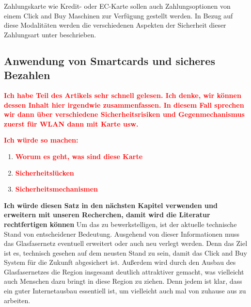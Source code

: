 Zahlungskarte wie Kredit- oder EC-Karte sollen auch Zahlungsoptionen von einem Click and Buy Maschinen
zur Verfügung gestellt werden. In Bezug auf diese Modalitäten werden die verschiedenen Aspekten der 
Sicherheit dieser Zahlungsart unter beschrieben.


\subsection{Anwendung von Smartcards und sicheres Bezahlen}
\textbf{\textcolor{red}{Ich habe Teil des Artikels sehr schnell gelesen. Ich denke, wir können dessen Inhalt hier
irgendwie zusammenfassen. In diesem Fall sprechen wir dann über verschiedene Sicherheitsrisiken und Gegenmechanismus
zuerst für WLAN dann mit Karte usw.}}

\textbf{\textcolor{red}{Ich würde so machen:}}


\begin{enumerate}
    \item \textbf{\textcolor{red}{Worum es geht, was sind diese Karte}}
    \item \textbf{\textcolor{red}{Sicherheitslücken}}
    \item \textbf{\textcolor{red}{Sicherheitsmechanismen}}
\end{enumerate}



\vspace{2cm}
\textbf{Ich würde diesen Satz in den nächsten Kapitel verwenden und erweitern mit unseren Recherchen, damit wird 
die Literatur rechtfertigen können}
Um das zu bewerkstelligen, ist der aktuelle technische Stand von entscheidener Bedeutung. 
Ausgehend von dieser Informationen muss das Glasfasernetz eventuell erweitert oder auch neu verlegt werden.
Denn das Ziel ist es, technisch gesehen auf dem neusten Stand zu sein, damit das Click and Buy System für die Zukunft abgesichert ist.
Außerdem wird durch den Ausbau des Glasfasernetzes die Region insgesamt deutlich attraktiver gemacht, was vielleicht auch Menschen dazu bringt
in diese Region zu ziehen. Denn jedem ist klar, dass ein guter Internetausbau essentiell ist, um vielleicht auch mal von zuhause aus zu arbeiten.
